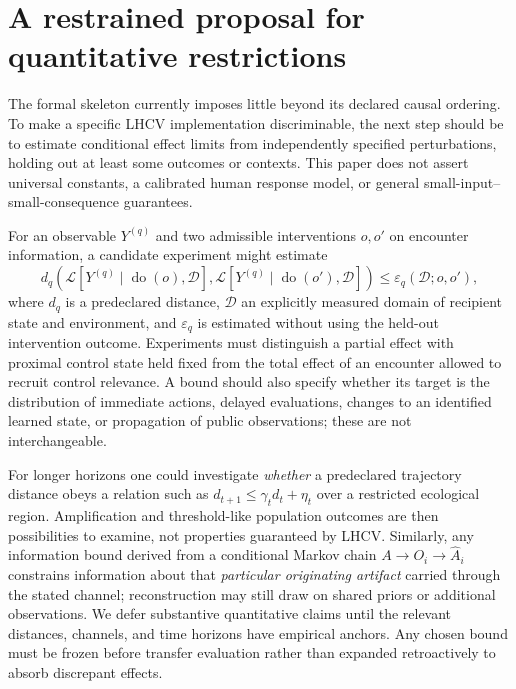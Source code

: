 \documentclass[11pt,a4paper]{article}
\newcommand{\doop}{\operatorname{do}}
\begin{document}
\section{A restrained proposal for quantitative restrictions}
The formal skeleton currently imposes little beyond its declared causal ordering. To make a specific LHCV implementation discriminable, the next step should be to estimate conditional effect limits from independently specified perturbations, holding out at least some outcomes or contexts. This paper does not assert universal constants, a calibrated human response model, or general small-input--small-consequence guarantees.

For an observable $Y^{(q)}$ and two admissible interventions $o,o'$ on encounter information, a candidate experiment might estimate
\begin{equation}
 d_q\!\left(\mathcal L[Y^{(q)}\mid\doop(o),\mathcal D],
               \mathcal L[Y^{(q)}\mid\doop(o'),\mathcal D]\right)
 \leq \varepsilon_q(\mathcal D;o,o'),\label{eq:bound}
\end{equation}
where $d_q$ is a predeclared distance, $\mathcal D$ an explicitly measured domain of recipient state and environment, and $\varepsilon_q$ is estimated without using the held-out intervention outcome. Experiments must distinguish a partial effect with proximal control state held fixed from the total effect of an encounter allowed to recruit control relevance. A bound should also specify whether its target is the distribution of immediate actions, delayed evaluations, changes to an identified learned state, or propagation of public observations; these are not interchangeable.

For longer horizons one could investigate \emph{whether} a predeclared trajectory distance obeys a relation such as $d_{t+1}\leq\gamma_t d_t+\eta_t$ over a restricted ecological region. Amplification and threshold-like population outcomes are then possibilities to examine, not properties guaranteed by LHCV. Similarly, any information bound derived from a conditional Markov chain $A\to O_i\to\widehat A_i$ constrains information about that \emph{particular originating artifact} carried through the stated channel; reconstruction may still draw on shared priors or additional observations. We defer substantive quantitative claims until the relevant distances, channels, and time horizons have empirical anchors. Any chosen bound must be frozen before transfer evaluation rather than expanded retroactively to absorb discrepant effects.
\end{document}
